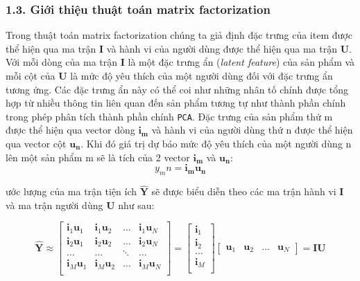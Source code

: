 \documentclass[11pt]{article}
\begin{document}
\subsubsection{1.3. Giới thiệu thuật toán matrix
factorization}\label{giux1edbi-thiux1ec7u-thuux1eadt-touxe1n-matrix-factorization}

Trong thuật toán matrix factorization chúng ta giả định đặc trưng của
item được thể hiện qua ma trận \(\mathbf{I}\) và hành vi của người dùng
được thể hiện qua ma trận \(\mathbf{U}\). Với mỗi dòng của ma trận
\(\mathbf{I}\) là một đặc trưng ẩn (\emph{latent feature}) của sản phẩm
và mỗi cột của \(\mathbf{U}\) là mức độ yêu thích của một người dùng đối
với đặc trưng ẩn tương ứng. Các đặc trưng ẩn này có thể coi như những
nhân tố chính được tổng hợp từ nhiều thông tin liên quan đến sản phẩm
tương tự như thành phần chính trong phép phân tích thành phần chính
\texttt{PCA}. Đặc trưng của sản phẩm thứ m được thể hiện qua vector dòng
\(\mathbf{i_m}\) và hành vi của người dùng thứ n được thể hiện qua
vector cột \(\mathbf{u_n}\). Khi đó giá trị dự báo mức độ yêu thích của
một người dùng n lên một sản phẩm m sẽ là tích của 2 vector
\(\mathbf{i_m}\) và \(\mathbf{u_n}\):
\[y_mn = \mathbf{i_m} \mathbf{u_n}\]

ước lượng của ma trận tiện ích \(\mathbf{\hat{Y}}\) sẽ được biểu diễn
theo các ma trận hành vi \(\mathbf{I}\) và ma trận người dùng
\(\mathbf{U}\) như sau:

\[\mathbf{\hat{Y}} \approx \left[ \begin{matrix}
\mathbf{i}_1\mathbf{u}_1 & \mathbf{i}_1\mathbf{u}_2 & \dots & \mathbf{i}_1 \mathbf{u}_N\\
\mathbf{i}_2\mathbf{u}_1 & \mathbf{i}_2\mathbf{u}_2 & \dots & \mathbf{i}_2 \mathbf{u}_N\\
\dots & \dots & \ddots & \dots \\
\mathbf{i}_M\mathbf{u}_1 & \mathbf{i}_M\mathbf{u}_2 & \dots & \mathbf{i}_M \mathbf{u}_N\\
\end{matrix} \right]
 = \left[ \begin{matrix}
\mathbf{i}_1 \\
\mathbf{i}_2 \\
\dots \\
\mathbf{i}_M \\
\end{matrix} \right]
\left[ \begin{matrix}
\mathbf{u}_1 & \mathbf{u}_2 & \dots & \mathbf{u}_N
\end{matrix} \right] = \mathbf{IU}\]
\end{document}
